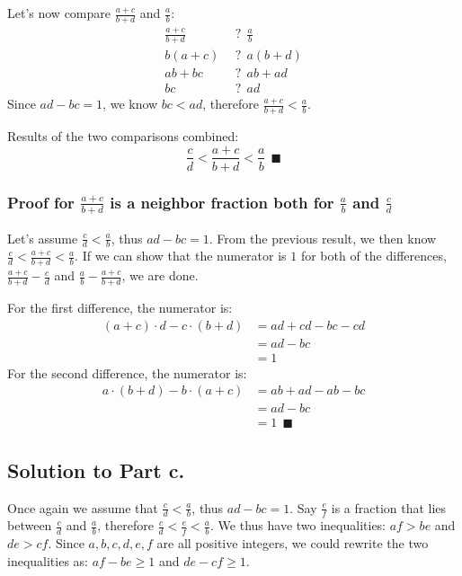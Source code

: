 \documentclass{article}
\begin{document}
Let's now compare $\frac{a+c}{b+d}$ and $\frac{a}{b}$:
\begin{displaymath}
\begin{split}
\frac{a+c}{b+d}\ \ &?\ \ \frac{a}{b}\\
         b(a+c)\ \ &?\ \ a(b+d)\\
          ab+bc\ \ &?\ \ ab+ad\\
             bc\ \ &?\ \ ad
\end{split}
\end{displaymath}
Since $ad-bc = 1$, we know $bc < ad$, therefore $\frac{a+c}{b+d} < \frac{a}{b}$.

Results of the two comparisons combined:
\[
	\frac{c}{d} < \frac{a+c}{b+d} < \frac{a}{b}\ \ \blacksquare
\]

\subsubsection*{Proof for $\frac{a+c}{b+d}$ is a neighbor fraction both for $\frac{a}{b}$ and $\frac{c}{d}$}
Let's assume $\frac{c}{d} < \frac{a}{b}$, thus $ad-bc = 1$. From the previous result, we then know $\frac{c}{d} < \frac{a+c}{b+d} < \frac{a}{b}$. If we can show that the numerator is $1$ for both of the differences, $\frac{a+c}{b+d}-\frac{c}{d}$ and $\frac{a}{b}-\frac{a+c}{b+d}$, we are done. 

For the first difference, the numerator is:
\begin{displaymath}
\begin{split}
(a+c) \cdot d - c \cdot (b+d) &= ad+cd - bc-cd\\
                              &= ad-bc\\
                              &= 1
\end{split}
\end{displaymath}
For the second difference, the numerator is:
\begin{displaymath}
\begin{split}
a \cdot (b+d) - b \cdot (a+c) &= ab+ad - ab-bc\\
                              &= ad-bc\\
                              &= 1\ \ \blacksquare
\end{split}
\end{displaymath}

\subsection*{Solution to Part c.}
Once again we assume that $\frac{c}{d} < \frac{a}{b}$, thus $ad-bc = 1$. Say $\frac{e}{f}$ is a fraction that lies between $\frac{c}{d}$ and $\frac{a}{b}$, therefore $\frac{c}{d} < \frac{e}{f} < \frac{a}{b}$. We thus have two inequalities: $af > be$ and $de > cf$. Since $a, b, c, d, e, f$ are all positive integers, we could rewrite the two inequalities as: $af-be \geq 1$ and $de-cf \geq 1$.
\end{document}
